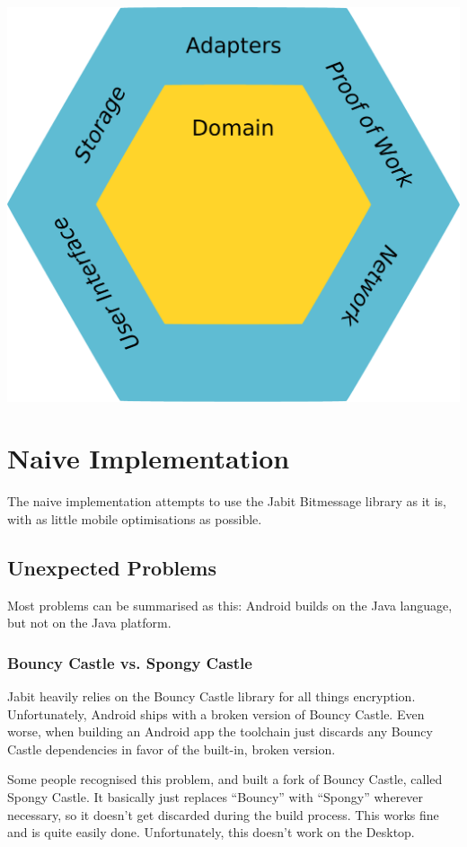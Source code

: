 \documentclass{bfh}
\begin{document}
  \includegraphics[width=\textwidth]{images/ports_and_adapters.pdf}
  
  \section{Naive Implementation}
  
  The naive implementation attempts to use the Jabit Bitmessage library as it is, with as little mobile optimisations as possible.

  \subsection{Unexpected Problems}
  Most problems can be summarised as this: Android builds on the Java language, but not on the Java platform.
  
  \subsubsection{Bouncy Castle vs. Spongy Castle}
  Jabit heavily relies on the Bouncy Castle library for all things encryption. Unfortunately, Android ships with a broken version of Bouncy Castle. Even worse, when building an Android app the toolchain just discards any Bouncy Castle dependencies in favor of the built-in, broken version.

  Some people recognised this problem, and built a fork of Bouncy Castle, called Spongy Castle. It basically just replaces “Bouncy” with “Spongy” wherever necessary, so it doesn’t get discarded during the build process. This works fine and is quite easily done. Unfortunately, this doesn’t work on the Desktop.
\end{document}
